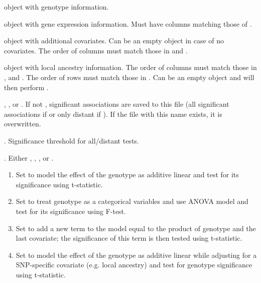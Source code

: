 \documentclass[a4paper]{book}
\begin{document}
\begin{Arguments}
\begin{ldescription}
\item[\code{snps}]  object with genotype information.

\item[\code{gene}]  object with gene expression information.
Must have columns matching those of .

\item[\code{cvrt}]  object with additional covariates.
Can be an empty  object in case of no covariates.
The order of columns must match those in  and .

\item[\code{local}]  object with local ancestry information.
The order of columns must match those in ,  and .
The order of rows must match those in .
Can be an empty  object and will then perform .

\item[\code{output\_file\_name}] , , or .
If not , significant associations are saved to this file (all significant associations
if  or only distant if ).
If the file with this name exists, it is overwritten.

\item[\code{pvOutputThreshold}] . Significance threshold for all/distant tests.

\item[\code{useModel}] . Either , ,
, or .
\begin{enumerate}

\item Set  to model
the effect of the genotype as additive linear and
test for its significance using t-statistic.
\item Set  to treat genotype
as a categorical variables and use ANOVA model and
test for its significance using F-test.
\item Set  to add
a new term to the model equal to the product of genotype and
the last covariate; the significance of this term is
then tested using t-statistic.
\item Set  to model the
effect of the genotype as additive linear while adjusting for a
SNP-specific covariate (e.g. local ancestry) and test for genotype
significance using t-statistic.


\end{enumerate}
\end{ldescription}
\end{Arguments}
\end{document}
